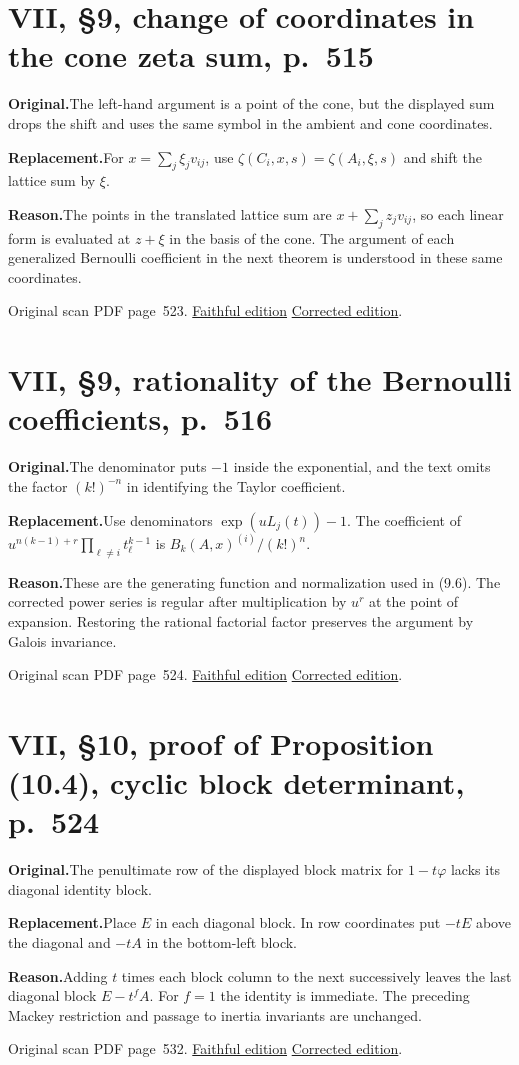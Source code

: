 \documentclass[11pt,a4paper]{article}
\newcommand{\original}{\par\smallskip\noindent\textbf{Original.}\enspace}
\newcommand{\replacement}{\par\smallskip\noindent\textbf{Replacement.}\enspace}
\newcommand{\reason}{\par\smallskip\noindent\textbf{Reason.}\enspace}
\newcommand{\editionlink}[3]{\href{#1\#errata.#2}{#3}}
\newcommand{\location}[2]{%
  \par\smallskip\noindent Original scan PDF page~#2.\enspace
  \editionlink{Neukirch_Faithful.pdf}{#1}{Faithful edition}
  \quad\editionlink{Neukirch_Corrected.pdf}{#1}{Corrected edition}.}
\begin{document}
\setcounter{section}{157}
\section{VII, \S9, change of coordinates in the cone zeta sum, p.~515}\label{errata:item:158}

\original The left-hand argument is a point of the cone, but the displayed sum drops the shift and uses the same symbol in the ambient and cone coordinates.
\replacement For $x=\sum_j\xi_jv_{ij}$, use $\zeta(C_i,x,s)=\zeta(A_i,\xi,s)$ and shift the lattice sum by $\xi$.
\reason The points in the translated lattice sum are $x+\sum_j z_jv_{ij}$, so each linear form is evaluated at $z+\xi$ in the basis of the cone. The argument of each generalized Bernoulli coefficient in the next theorem is understood in these same coordinates.
\location{158}{523}

\setcounter{section}{158}
\section{VII, \S9, rationality of the Bernoulli coefficients, p.~516}\label{errata:item:159}

\original The denominator puts $-1$ inside the exponential, and the text omits the factor $(k!)^{-n}$ in identifying the Taylor coefficient.
\replacement Use denominators $\exp(uL_j(t))-1$. The coefficient of $u^{n(k-1)+r}\prod_{\ell\ne i}t_\ell^{k-1}$ is $B_k(A,x)^{(i)}/(k!)^n$.
\reason These are the generating function and normalization used in (9.6). The corrected power series is regular after multiplication by $u^r$ at the point of expansion. Restoring the rational factorial factor preserves the argument by Galois invariance.
\location{159}{524}

\setcounter{section}{159}
\section{VII, \S10, proof of Proposition (10.4), cyclic block determinant, p.~524}\label{errata:item:160}

\original The penultimate row of the displayed block matrix for $1-t\varphi$ lacks its diagonal identity block.
\replacement Place $E$ in each diagonal block. In row coordinates put $-tE$ above the diagonal and $-tA$ in the bottom-left block.
\reason Adding $t$ times each block column to the next successively leaves the last diagonal block $E-t^fA$. For $f=1$ the identity is immediate. The preceding Mackey restriction and passage to inertia invariants are unchanged.
\location{160}{532}
\end{document}

